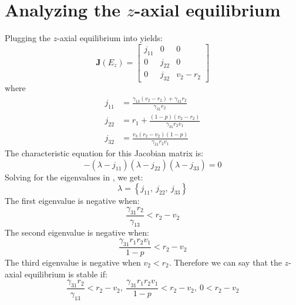 \section{Analyzing the $z$-axial equilibrium}\label{sec:stability_z_axial_equilibrium}
Plugging the $z$-axial equilibrium into  yields:
\begin{equation}
    \textbf{J}\left(E_z\right)=\begin{bmatrix}
        j_{11} & 0 & 0\\
        0 & j_{22} & 0\\
        0 & j_{32} & v_2-r_2
    \end{bmatrix}
    \label{eq:5.8}
\end{equation}
where
\begin{align*}
    j_{11} &= \frac{\gamma_{13}\left(v_2-r_2\right)+\gamma_{31}r_2}{\gamma_{31}r_2}\\
    j_{22} &= r_1+\frac{\left(1-p\right)\left(v_2-r_2\right)}{\gamma_{31}r_2v_1}\\
    j_{32} &= \frac{v_3\left(r_2-v_2\right)\left(1-p\right)}{\gamma_{31}r_2v_1}
\end{align*}
The characteristic equation for this Jacobian matrix is:
\begin{equation}
    -\left(\lambda-j_{11}\right)\left(\lambda-j_{22}\right)\left(\lambda-j_{33}\right)=0
    \label{eq:5.9}
\end{equation}
Solving for the eigenvalues in , we get:
\[
\lambda=\left\{
j_{11}, \
j_{22}, \
j_{33}
\right\}
\]
The first eigenvalue is negative when:
\[
\frac{\gamma_{31}r_2}{\gamma_{13}}<r_2-v_2
\]
The second eigenvalue is negative when:
\[
\frac{\gamma_{31}r_1r_2v_1}{1-p}<r_2-v_2
\]
The third eigenvalue is negative when $v_2<r_2$. Therefore we can say that the $z$-axial equilibrium is stable if:
\[
\frac{\gamma_{31}r_2}{\gamma_{13}}<r_2-v_2,\ \frac{\gamma_{31}r_1r_2v_1}{1-p}<r_2-v_2,\ 0<r_2-v_2
\]

